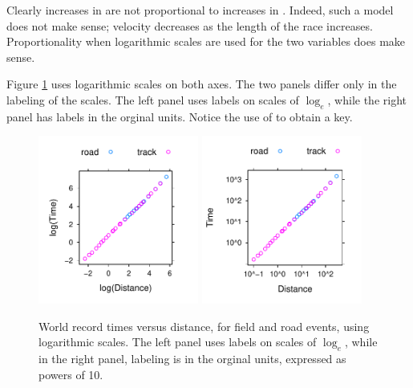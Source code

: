 Clearly increases in  are not proportional to increases in
.  Indeed, such a model does not make sense; velocity
decreases as the length of the race increases.  Proportionality when
logarithmic scales are used for the two variables does make sense.

Figure \ref{fig:wrlog} uses logarithmic scales on both axes.  The two
panels differ only in the labeling of the scales.  The left panel uses
labels on scales of $\log_e$, while the right panel has labels in the
orginal units.  Notice the use of
 to obtain a key.

\begin{figure}
\begin{Schunk}


\centerline{\includegraphics[width=0.47\textwidth]{figs/03-wrTimesAB-1} \includegraphics[width=0.47\textwidth]{figs/03-wrTimesAB-2} }

\end{Schunk}
\caption{World record times versus distance, for field and road
  events, using logarithmic scales.  The left panel uses labels on
  scales of $\log_e$, while in the right panel, labeling is in the
  orginal units, expressed as powers of 10.}
\label{fig:wrlog}
\end{figure}

